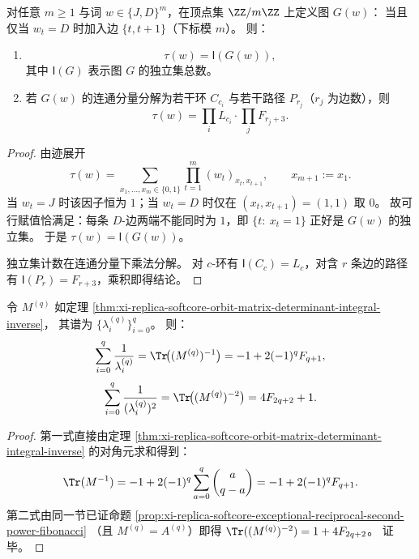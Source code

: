\begin{theorem}\label{thm:xi-replica-softcore-wordtrace-independent-set-factorization}
对任意 \(m\ge 1\) 与词 \(w\in\{J,D\}^m\)，在顶点集 \(\ZZ/m\ZZ\) 上定义图 \(G(w)\)：
当且仅当 \(w_t=D\) 时加入边 \(\{t,t+1\}\)（下标模 \(m\)）。
则：
\begin{enumerate}
  \item \[
  \tau(w)=\mathsf I(G(w)),
  \]
  其中 \(\mathsf I(G)\) 表示图 \(G\) 的独立集总数。
  \item 若 \(G(w)\) 的连通分量分解为若干环 \(C_{c_i}\) 与若干路径 \(P_{r_j}\)（\(r_j\) 为边数），则
  \[
  \tau(w)=\prod_i L_{c_i}\cdot\prod_j F_{r_j+3}.
  \]
\end{enumerate}
\end{theorem}
\begin{proof}
由迹展开
\[
\tau(w)=\sum_{x_1,\dots,x_m\in\{0,1\}}
\prod_{t=1}^{m}(w_t)_{x_t,x_{t+1}},
\qquad x_{m+1}:=x_1.
\]
当 \(w_t=J\) 时该因子恒为 \(1\)；当 \(w_t=D\) 时仅在 \((x_t,x_{t+1})=(1,1)\) 取 \(0\)。
故可行赋值恰满足：每条 \(D\)-边两端不能同时为 \(1\)，即
\(\{t:\ x_t=1\}\) 正好是 \(G(w)\) 的独立集。
于是 \(\tau(w)=\mathsf I(G(w))\)。

独立集计数在连通分量下乘法分解。
对 \(c\)-环有 \(\mathsf I(C_c)=L_c\)，对含 \(r\) 条边的路径有
\(\mathsf I(P_r)=F_{r+3}\)，乘积即得结论。
\end{proof}

\begin{corollary}\label{cor:xi-replica-softcore-exceptional-reciprocal-moments-fibonacci-unified}
令 \(M^{(q)}\) 如定理
\ref{thm:xi-replica-softcore-orbit-matrix-determinant-integral-inverse}，
其谱为 \(\{\lambda_i^{(q)}\}_{i=0}^{q}\)。
则：
\[
\sum_{i=0}^{q}\frac1{\lambda_i^{(q)}}
=\Tr\!\bigl((M^{(q)})^{-1}\bigr)
=-1+2(-1)^qF_{q+1},
\]
\[
\sum_{i=0}^{q}\frac1{(\lambda_i^{(q)})^2}
=\Tr\!\bigl((M^{(q)})^{-2}\bigr)
=4F_{2q+2}+1.
\]
\end{corollary}
\begin{proof}
第一式直接由定理
\ref{thm:xi-replica-softcore-orbit-matrix-determinant-integral-inverse}
的对角元求和得到：
\[
\Tr(M^{-1})
=-1+2(-1)^q\sum_{a=0}^{q}\binom{a}{q-a}
=-1+2(-1)^qF_{q+1}.
\]
第二式由同一节已证命题
\ref{prop:xi-replica-softcore-exceptional-reciprocal-second-power-fibonacci}
（且 \(M^{(q)}=A^{(q)}\)）即得
\(
\Tr((M^{(q)})^{-2})=1+4F_{2q+2}
\)。
证毕。
\end{proof}

\endinput
